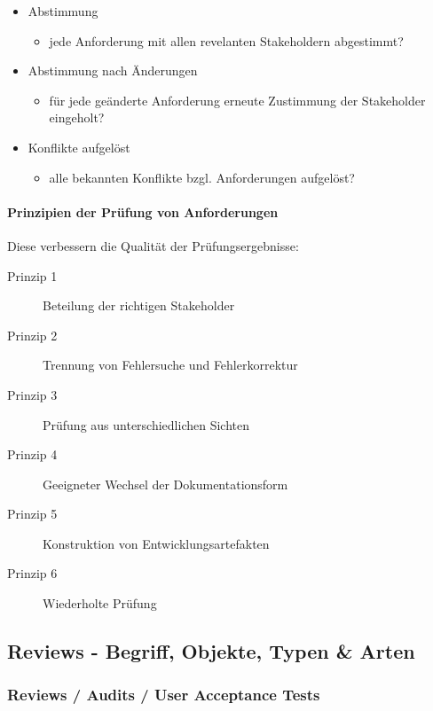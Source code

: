 \documentclass[a4paper]{article}
\begin{document}
				\begin{itemize}
					\item Abstimmung
						\begin{itemize}
							\item jede Anforderung mit allen revelanten Stakeholdern abgestimmt?
						\end{itemize}
					\item Abstimmung nach Änderungen
						\begin{itemize}
							\item für jede geänderte Anforderung erneute Zustimmung der Stakeholder eingeholt?
						\end{itemize}
					\item Konflikte aufgelöst
						\begin{itemize}
							\item alle bekannten Konflikte bzgl. Anforderungen aufgelöst?
						\end{itemize}
				\end{itemize}
			
				\paragraph{Prinzipien der Prüfung von Anforderungen}
				
				Diese verbessern die Qualität der Prüfungsergebnisse:
				
				\begin{description}
					\item[Prinzip 1] Beteilung der richtigen Stakeholder
					\item[Prinzip 2] Trennung von Fehlersuche und Fehlerkorrektur
					\item[Prinzip 3] Prüfung aus unterschiedlichen Sichten
					\item[Prinzip 4] Geeigneter Wechsel der Dokumentationsform
					\item[Prinzip 5] Konstruktion von Entwicklungsartefakten
					\item[Prinzip 6] Wiederholte Prüfung
				\end{description}
		
\newpage
			
		\subsection{Reviews - Begriff, Objekte, Typen \& Arten}
		
			\subsubsection{Reviews / Audits / User Acceptance Tests}
			
\end{document}
